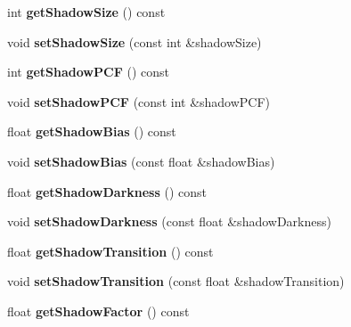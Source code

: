 \begin{DoxyCompactItemize}
int {\bfseries get\+Shadow\+Size} () const
\item 
\mbox{\label{classflounder_1_1shadows_a96739f6bbcd59fe1dabcf1adbee7b38c}} 
void {\bfseries set\+Shadow\+Size} (const int \&shadow\+Size)
\item 
\mbox{\label{classflounder_1_1shadows_a6512d40cbbda336396ca6119f827c484}} 
int {\bfseries get\+Shadow\+P\+CF} () const
\item 
\mbox{\label{classflounder_1_1shadows_ab003f18735d83de1083de2dfbd5e30d6}} 
void {\bfseries set\+Shadow\+P\+CF} (const int \&shadow\+P\+CF)
\item 
\mbox{\label{classflounder_1_1shadows_a511cece86db46843187eb31be28628a3}} 
float {\bfseries get\+Shadow\+Bias} () const
\item 
\mbox{\label{classflounder_1_1shadows_ac17774d21a95b3903cbfd842f2f48a0a}} 
void {\bfseries set\+Shadow\+Bias} (const float \&shadow\+Bias)
\item 
\mbox{\label{classflounder_1_1shadows_ac13ec729f05468b33bca983df632657d}} 
float {\bfseries get\+Shadow\+Darkness} () const
\item 
\mbox{\label{classflounder_1_1shadows_af2b78e1cd701e5cfecc4f1dc7dcd1c3d}} 
void {\bfseries set\+Shadow\+Darkness} (const float \&shadow\+Darkness)
\item 
\mbox{\label{classflounder_1_1shadows_a61c5babed25bef2b7f33987a2f190f48}} 
float {\bfseries get\+Shadow\+Transition} () const
\item 
\mbox{\label{classflounder_1_1shadows_a624b90f02fcf1474edb8932b45f28182}} 
void {\bfseries set\+Shadow\+Transition} (const float \&shadow\+Transition)
\item 
\mbox{\label{classflounder_1_1shadows_a74c8399fdf7481a2327c6d186f789cd0}} 
float {\bfseries get\+Shadow\+Factor} () const
\item 

\end{DoxyCompactItemize}
